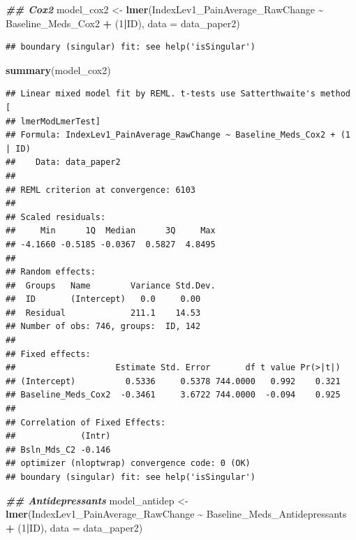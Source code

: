\documentclass[
  12pt,
]{article}
\newenvironment{Shaded}{\begin{snugshade}}{\end{snugshade}}
\newcommand{\AttributeTok}[1]{\textcolor[rgb]{0.13,0.29,0.53}{#1}}
\newcommand{\DecValTok}[1]{\textcolor[rgb]{0.00,0.00,0.81}{#1}}
\newcommand{\DocumentationTok}[1]{\textcolor[rgb]{0.56,0.35,0.01}{\textbf{\textit{#1}}}}
\newcommand{\FunctionTok}[1]{\textcolor[rgb]{0.13,0.29,0.53}{\textbf{#1}}}
\newcommand{\NormalTok}[1]{#1}
\newcommand{\OtherTok}[1]{\textcolor[rgb]{0.56,0.35,0.01}{#1}}
\newcommand{\SpecialCharTok}[1]{\textcolor[rgb]{0.81,0.36,0.00}{\textbf{#1}}}
\begin{document}
\begin{Shaded}
\begin{Highlighting}[]
\DocumentationTok{\#\# Cox2}
\NormalTok{model\_cox2 }\OtherTok{\textless{}{-}} \FunctionTok{lmer}\NormalTok{(IndexLev1\_PainAverage\_RawChange }\SpecialCharTok{\textasciitilde{}}\NormalTok{ Baseline\_Meds\_Cox2 }\SpecialCharTok{+}\NormalTok{ (}\DecValTok{1}\SpecialCharTok{|}\NormalTok{ID), }\AttributeTok{data =}\NormalTok{ data\_paper2)}
\end{Highlighting}
\end{Shaded}

\begin{verbatim}
## boundary (singular) fit: see help('isSingular')
\end{verbatim}

\begin{Shaded}
\begin{Highlighting}[]
\FunctionTok{summary}\NormalTok{(model\_cox2)}
\end{Highlighting}
\end{Shaded}

\begin{verbatim}
## Linear mixed model fit by REML. t-tests use Satterthwaite's method [
## lmerModLmerTest]
## Formula: IndexLev1_PainAverage_RawChange ~ Baseline_Meds_Cox2 + (1 | ID)
##    Data: data_paper2
## 
## REML criterion at convergence: 6103
## 
## Scaled residuals: 
##     Min      1Q  Median      3Q     Max 
## -4.1660 -0.5185 -0.0367  0.5827  4.8495 
## 
## Random effects:
##  Groups   Name        Variance Std.Dev.
##  ID       (Intercept)   0.0     0.00   
##  Residual             211.1    14.53   
## Number of obs: 746, groups:  ID, 142
## 
## Fixed effects:
##                    Estimate Std. Error       df t value Pr(>|t|)
## (Intercept)          0.5336     0.5378 744.0000   0.992    0.321
## Baseline_Meds_Cox2  -0.3461     3.6722 744.0000  -0.094    0.925
## 
## Correlation of Fixed Effects:
##             (Intr)
## Bsln_Mds_C2 -0.146
## optimizer (nloptwrap) convergence code: 0 (OK)
## boundary (singular) fit: see help('isSingular')
\end{verbatim}

\begin{Shaded}
\begin{Highlighting}[]
\DocumentationTok{\#\# Antidepressants}
\NormalTok{model\_antidep }\OtherTok{\textless{}{-}} \FunctionTok{lmer}\NormalTok{(IndexLev1\_PainAverage\_RawChange }\SpecialCharTok{\textasciitilde{}}\NormalTok{ Baseline\_Meds\_Antidepressants }\SpecialCharTok{+}\NormalTok{ (}\DecValTok{1}\SpecialCharTok{|}\NormalTok{ID), }\AttributeTok{data =}\NormalTok{ data\_paper2)}
\end{Highlighting}
\end{Shaded}
\end{document}
